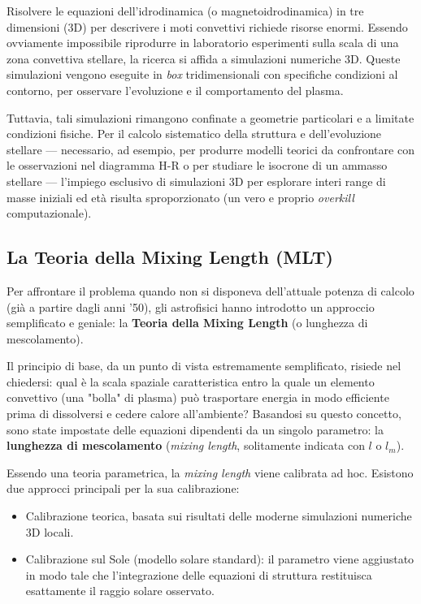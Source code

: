 Risolvere le equazioni dell'idrodinamica (o magnetoidrodinamica) in tre dimensioni (3D) per descrivere i moti convettivi richiede risorse enormi. Essendo ovviamente impossibile riprodurre in laboratorio esperimenti sulla scala di una zona convettiva stellare, la ricerca si affida a simulazioni numeriche 3D. Queste simulazioni vengono eseguite in \textit{box} tridimensionali con specifiche condizioni al contorno, per osservare l'evoluzione e il comportamento del plasma.

Tuttavia, tali simulazioni rimangono confinate a geometrie particolari e a limitate condizioni fisiche. Per il calcolo sistematico della struttura e dell'evoluzione stellare — necessario, ad esempio, per produrre modelli teorici da confrontare con le osservazioni nel diagramma H-R o per studiare le isocrone di un ammasso stellare — l'impiego esclusivo di simulazioni 3D per esplorare interi range di masse iniziali ed età risulta sproporzionato (un vero e proprio \textit{overkill} computazionale).

\subsection{La Teoria della Mixing Length (MLT)}

Per affrontare il problema quando non si disponeva dell'attuale potenza di calcolo (già a partire dagli anni '50), gli astrofisici hanno introdotto un approccio semplificato e geniale: la \textbf{Teoria della Mixing Length} (o lunghezza di mescolamento).

Il principio di base, da un punto di vista estremamente semplificato, risiede nel chiedersi: qual è la scala spaziale caratteristica entro la quale un elemento convettivo (una "bolla" di plasma) può trasportare energia in modo efficiente prima di dissolversi e cedere calore all'ambiente?
Basandosi su questo concetto, sono state impostate delle equazioni dipendenti da un singolo parametro: la \textbf{lunghezza di mescolamento} (\textit{mixing length}, solitamente indicata con $l$ o $l_m$).

Essendo una teoria parametrica, la \textit{mixing length} viene calibrata ad hoc. Esistono due approcci principali per la sua calibrazione:
\begin{itemize}
\item Calibrazione teorica, basata sui risultati delle moderne simulazioni numeriche 3D locali.
\item Calibrazione sul Sole (modello solare standard): il parametro viene aggiustato in modo tale che l'integrazione delle equazioni di struttura restituisca esattamente il raggio solare osservato.
\end{itemize}

